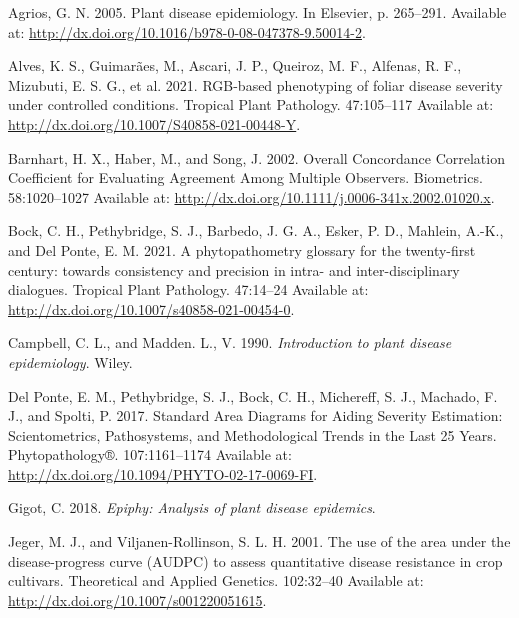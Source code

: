\documentclass[
  letterpaper,
  DIV=11,
  numbers=noendperiod]{scrreprt}
\newlength{\cslhangindent}
\newlength{\cslentryspacingunit} %
\newenvironment{CSLReferences}[2] %
 {%
  \setlength{\parindent}{0pt}
  \ifodd #1
  \let\oldpar\par
  \def\par{\hangindent=\cslhangindent\oldpar}
  \fi
  \setlength{\parskip}{#2\cslentryspacingunit}
 }%
 {}
\begin{document}
\hypertarget{refs}{}
\begin{CSLReferences}{0}{0}
\leavevmode{}%
Agrios, G. N. 2005. Plant disease epidemiology. In Elsevier, p.
265--291. Available at:
\url{http://dx.doi.org/10.1016/b978-0-08-047378-9.50014-2}.

\leavevmode{}%
Alves, K. S., Guimarães, M., Ascari, J. P., Queiroz, M. F., Alfenas, R.
F., Mizubuti, E. S. G., et al. 2021. RGB-based phenotyping of foliar
disease severity under controlled conditions. Tropical Plant Pathology.
47:105--117 Available at:
\url{http://dx.doi.org/10.1007/S40858-021-00448-Y}.

\leavevmode{}%
Barnhart, H. X., Haber, M., and Song, J. 2002. Overall Concordance
Correlation Coefficient for Evaluating Agreement Among Multiple
Observers. Biometrics. 58:1020--1027 Available at:
\url{http://dx.doi.org/10.1111/j.0006-341x.2002.01020.x}.

\leavevmode{}%
Bock, C. H., Pethybridge, S. J., Barbedo, J. G. A., Esker, P. D.,
Mahlein, A.-K., and Del Ponte, E. M. 2021. A phytopathometry glossary
for the twenty-first century: towards consistency and precision in
intra- and inter-disciplinary dialogues. Tropical Plant Pathology.
47:14--24 Available at:
\url{http://dx.doi.org/10.1007/s40858-021-00454-0}.

\leavevmode{}%
Campbell, C. L., and Madden. L., V. 1990. \emph{Introduction to plant
disease epidemiology}. Wiley.

\leavevmode{}%
Del Ponte, E. M., Pethybridge, S. J., Bock, C. H., Michereff, S. J.,
Machado, F. J., and Spolti, P. 2017. Standard Area Diagrams for Aiding
Severity Estimation: Scientometrics, Pathosystems, and Methodological
Trends in the Last 25 Years. Phytopathology®. 107:1161--1174 Available
at: \url{http://dx.doi.org/10.1094/PHYTO-02-17-0069-FI}.

\leavevmode{}%
Gigot, C. 2018. \emph{Epiphy: Analysis of plant disease epidemics}.

\leavevmode{}%
Jeger, M. J., and Viljanen-Rollinson, S. L. H. 2001. The use of the area
under the disease-progress curve (AUDPC) to assess quantitative disease
resistance in crop cultivars. Theoretical and Applied Genetics.
102:32--40 Available at: \url{http://dx.doi.org/10.1007/s001220051615}.


\end{CSLReferences}
\end{document}
